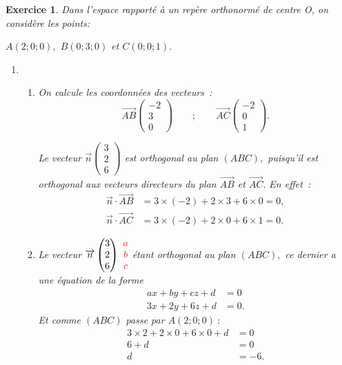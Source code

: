 \documentclass[10pt]{article}
\newtheorem{exo}{Exercice}
\begin{document}
\begin{exo}

Dans l'espace rapporté à un repère orthonormé de centre O, on considère les points:

$A(2;0;0),$ $B(0;3;0)$ et $C(0;0;1).$





\begin{enumerate}
\item 
	\begin{enumerate}
		\item On calcule les coordonnées des vecteurs~:
\[\overrightarrow{AB}\begin{pmatrix} -2\\3\\0\end{pmatrix}\qquad;\qquad \overrightarrow{AC}\begin{pmatrix} -2\\0\\1\end{pmatrix}.\] 

Le vecteur $\overrightarrow{n}\begin{pmatrix}3\\2\\6\end{pmatrix}$ est orthogonal au plan $(ABC),$ puisqu'il est orthogonal aux vecteurs  directeurs du plan $\overrightarrow{AB}$ et $\overrightarrow{AC}.$ En effet~:
\begin{align*}
\overrightarrow{n}\cdot\overrightarrow{AB}&=3\times (-2)+2\times 3+6\times 0=0,\\
\overrightarrow{n}\cdot\overrightarrow{AC}&=3\times (-2)+2\times 0+6\times 1=0.
\end{align*}
\item Le vecteur $\overrightarrow{n}\begin{pmatrix}3\\2\\6\end{pmatrix}~\textcolor{red}{\begin{matrix}a\\b\\c\end{matrix}}$ étant orthogonal au plan $(ABC),$ ce dernier a une équation de la forme
\begin{align*}ax+by+cz+d&=0\\3x+2y+6z+d&=0.\end{align*}
Et comme $(ABC)$ passe par $A(2;0;0)~:$
\begin{align*}
3\times 2+2\times 0+6\times 0+d&=0\\
6+d&=0\\
d&=-6.\end{align*}


\end{enumerate}
\end{enumerate}
\end{exo}
\end{document}
